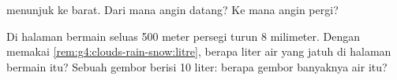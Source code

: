 \begin{exercise}[$\star\star$]\label{exo:g4:clouds-rain-snow:10}
 menunjuk ke barat. Dari mana angin datang? Ke mana
angin pergi?
\end{exercise}

\begin{exercise}[$\star\star\star$]\label{exo:g4:clouds-rain-snow:11}
Di halaman bermain seluas 500 meter persegi turun  8 milimeter.
Dengan memakai \cref{rem:g4:clouds-rain-snow:litre}, berapa liter air yang
jatuh di halaman bermain itu? Sebuah gembor berisi 10 liter: berapa gembor
banyaknya air itu?
\end{exercise}
